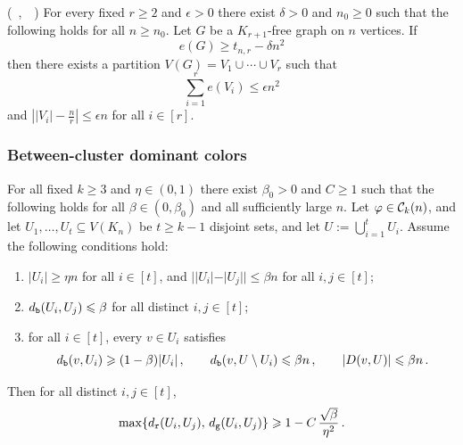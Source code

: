 \begin{theorem}{\normalfont(\citeauthor{erdos1967some}~\cite{erdos1967some},~\citeauthor{simonovits1968method}~\cite{simonovits1968method})}\label{thm:erdos-simonovits}
For every fixed $r\geq2$ and $\epsilon>0$ there exist $\delta>0$ and $n_0\geq0$ such that the following holds for all $n\geq n_0$. Let $G$ be a $K_{r+1}$-free graph on $n$ vertices. If
$$e(G)\geq t_{n,r}-\delta n^2$$
then there exists a partition $V(G)=V_1\cup\cdots\cup V_r$ such that
$$\sum_{i=1}^re(V_i)\leq\epsilon n^2$$
and $\left||V_i|-\frac{n}{r}\right|\leq \epsilon n$ for all $i\in[r]$.
\end{theorem}

\subsubsection{Between-cluster dominant colors}
\begin{lemma}\label{lemma:vertex-level-mixed-mass}
For all fixed $k\geq3$ and $\eta\in(0,1)$ there exist $\beta_0>0$ and $C\geq1$ such that the following holds for all $\beta\in(0,\beta_0)$ and all sufficiently large $n$. Let $\varphi\in{\mathcal C}_k(n)$, and let $U_1,\dots,U_t\subseteq V(K_n)$ be $t\geq k-1$ disjoint sets, and let $U:=\bigcup_{i=1}^tU_i$. Assume the following conditions hold:
\begin{enumerate}[
  label=\textit{(\roman*)},
  ref=(\textit{\roman*}),
  topsep=5pt
]
    \item\label{item:vertex-level-mixed-mass-1} $|U_i|\geq \eta n$ for all $i\in[t]$, and $||U_i|-|U_j||\leq \beta n$ for all $i,j\in[t]$;
    \item\label{item:vertex-level-mixed-mass-2} $d_{\normalfont\texttt b}(U_i,U_j)\leqslant\beta$ for all distinct $i,j\in[t]$;
    \item\label{item:vertex-level-mixed-mass-3} for all $i\in[t]$, every $v\in U_i$ satisfies
    $$d_{\normalfont\texttt b}(v,U_i)\geqslant (1-\beta)|U_i|\,,\qquad d_{\normalfont\texttt b}(v,U\setminus U_i)\leqslant \beta n\,,\qquad\lvert D(v,U)\rvert\leqslant \beta n\,.$$
\end{enumerate}
Then for all distinct $i,j\in[t]$,
\begin{equation}\label{eqn:dominant-color}
\max\{d_{\normalfont\texttt r}(U_i,U_j),\,d_{\normalfont\texttt g}(U_i,U_j)\} \geqslant 1-C\,\frac{\sqrt{\beta}}{\eta^2} \,.
\end{equation}
\end{lemma}

